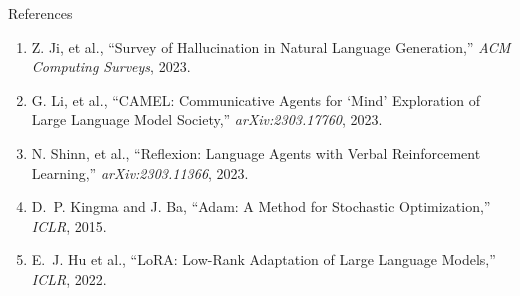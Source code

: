 \begin{frame}[allowframebreaks]{References}
\begin{enumerate}
        \item Z. Ji, et al., ``Survey of Hallucination in Natural Language Generation,'' \textit{ACM Computing Surveys}, 2023.
        \item G. Li, et al., ``CAMEL: Communicative Agents for `Mind' Exploration of Large Language Model Society,'' \textit{arXiv:2303.17760}, 2023.
        \item N. Shinn, et al., ``Reflexion: Language Agents with Verbal Reinforcement Learning,'' \textit{arXiv:2303.11366}, 2023.
        \item D.~P. Kingma and J. Ba, ``Adam: A Method for Stochastic Optimization,'' \textit{ICLR}, 2015.
        \item E.~J. Hu et al., ``LoRA: Low-Rank Adaptation of Large Language Models,'' \textit{ICLR}, 2022.
    \end{enumerate}
\end{frame}
